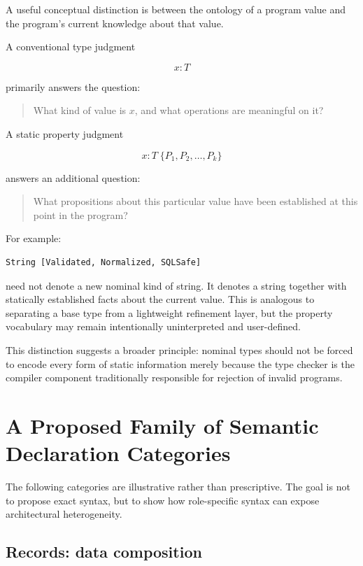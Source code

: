 \documentclass[11pt]{article}
\begin{document}
A useful conceptual distinction is between the ontology of a program value and the program's current knowledge about that value.

A conventional type judgment

\[
    x : T
\]

primarily answers the question:

\begin{quote}
What kind of value is $x$, and what operations are meaningful on it?
\end{quote}

A static property judgment

\[
    x : T\;\{P_1,P_2,\ldots,P_k\}
\]

answers an additional question:

\begin{quote}
What propositions about this particular value have been established at this point in the program?
\end{quote}

For example:

\begin{lstlisting}
String [Validated, Normalized, SQLSafe]
\end{lstlisting}

need not denote a new nominal kind of string. It denotes a string together with statically established facts about the current value. This is analogous to separating a base type from a lightweight refinement layer, but the property vocabulary may remain intentionally uninterpreted and user-defined.

This distinction suggests a broader principle: nominal types should not be forced to encode every form of static information merely because the type checker is the compiler component traditionally responsible for rejection of invalid programs.

\section{A Proposed Family of Semantic Declaration Categories}

The following categories are illustrative rather than prescriptive. The goal is not to propose exact syntax, but to show how role-specific syntax can expose architectural heterogeneity.

\subsection{Records: data composition}
\end{document}

